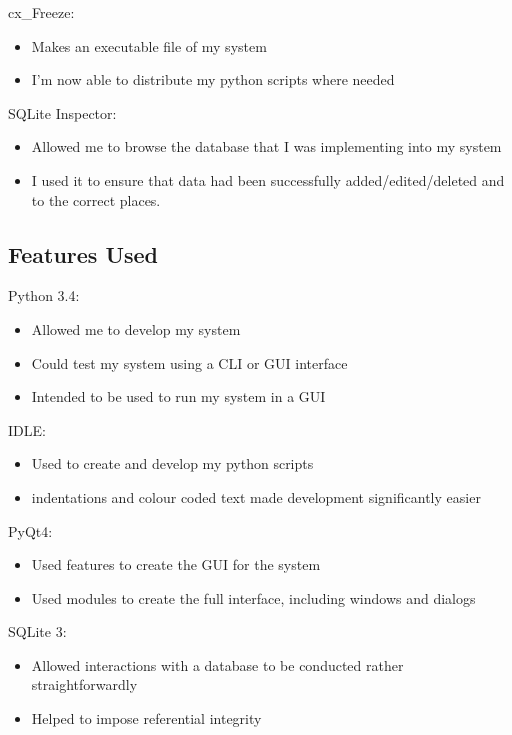 cx_Freeze:
\begin{itemize}
    \item Makes an executable file of my system
    \item I'm now able to distribute my python scripts where needed
\end{itemize}


SQLite Inspector:
\begin{itemize}
    \item Allowed me to browse the database that I was implementing into my system
    \item I used it to ensure that data had been successfully added/edited/deleted and to the correct places.
\end{itemize}


\subsection{Features Used}



Python 3.4:
\begin{itemize}
    \item Allowed me to develop my system
    \item Could test my system using a CLI or GUI interface
    \item Intended to be used to run my system in a GUI
\end{itemize}

IDLE:
\begin{itemize}    
    \item Used to create and develop my python scripts
    \item indentations and colour coded text made development significantly easier
\end{itemize}

PyQt4:
\begin{itemize}
    \item Used features to create the GUI for the system
    \item Used modules to create the full interface, including windows and dialogs
\end{itemize}

SQLite 3:
\begin{itemize}
    \item Allowed interactions with a database to be conducted rather straightforwardly
    \item Helped to impose referential integrity
\end{itemize}

